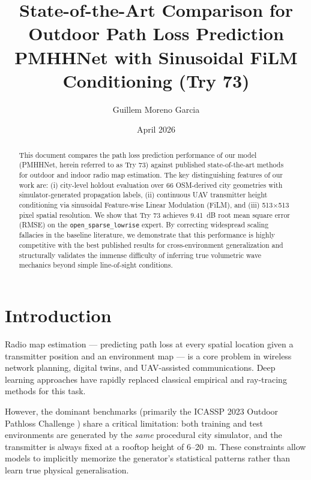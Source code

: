 \documentclass[11pt,a4paper]{article}
\title{%
    \textbf{State-of-the-Art Comparison for Outdoor Path Loss Prediction}\\[0.5em]
    \large PMHHNet with Sinusoidal FiLM Conditioning (Try 73)\\[0.3em]
}
\author{Guillem Moreno Garcia}
\date{April 2026}
\begin{document}
\maketitle
\thispagestyle{fancy}

\begin{abstract}
This document compares the path loss prediction performance of our model (PMHHNet,
herein referred to as Try 73) against published state-of-the-art methods for
outdoor and indoor radio map estimation. The key distinguishing features of our
work are: (i) city-level holdout evaluation over 66 OSM-derived city geometries
with simulator-generated propagation labels,
(ii) continuous UAV transmitter height conditioning via sinusoidal Feature-wise
Linear Modulation (FiLM), and (iii) 513$\times$513 pixel spatial resolution.
We show that Try 73 achieves 9.41~dB root mean square error (RMSE) on the
\texttt{open\_sparse\_lowrise} expert. By correcting widespread scaling fallacies in the baseline literature, we demonstrate that this performance is highly competitive with the best published results for cross-environment generalization and structurally validates the immense difficulty of inferring true volumetric wave mechanics beyond simple line-of-sight conditions.
\end{abstract}

\tableofcontents
\newpage

\section{Introduction}
\label{sec:intro}

Radio map estimation — predicting path loss at every spatial location given a
transmitter position and an environment map — is a core problem in wireless
network planning, digital twins, and UAV-assisted communications. Deep learning
approaches have rapidly replaced classical empirical and ray-tracing methods for
this task.

However, the dominant benchmarks (primarily the ICASSP 2023 Outdoor Pathloss
Challenge \cite{icassp2023challenge}) share a critical limitation: both training
and test environments are generated by the \emph{same} procedural city simulator,
and the transmitter is always fixed at a rooftop height of 6--20~m. These
constraints allow models to implicitly memorize the generator's statistical patterns
rather than learn true physical generalisation. 
\end{document}
